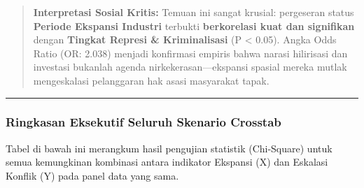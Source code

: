 \documentclass[
]{article}
\begin{document}
\begin{quote}
\textbf{Interpretasi Sosial Kritis:} Temuan ini sangat krusial:
pergeseran status \textbf{Periode Ekspansi Industri} terbukti
\textbf{berkorelasi kuat dan signifikan} dengan \textbf{Tingkat Represi
\& Kriminalisasi} (P \textless{} 0.05). Angka Odds Ratio (OR: 2.038)
menjadi konfirmasi empiris bahwa narasi hilirisasi dan investasi
bukanlah agenda nirkekerasan---ekspansi spasial mereka mutlak
mengeskalasi pelanggaran hak asasi masyarakat tapak.
\end{quote}

\begin{center}\rule{0.5\linewidth}{0.5pt}\end{center}

\subsubsection{Ringkasan Eksekutif Seluruh Skenario
Crosstab}\label{ringkasan-eksekutif-seluruh-skenario-crosstab}

Tabel di bawah ini merangkum hasil pengujian statistik (Chi-Square)
untuk semua kemungkinan kombinasi antara indikator Ekspansi (X) dan
Eskalasi Konflik (Y) pada panel data yang sama.
\end{document}
